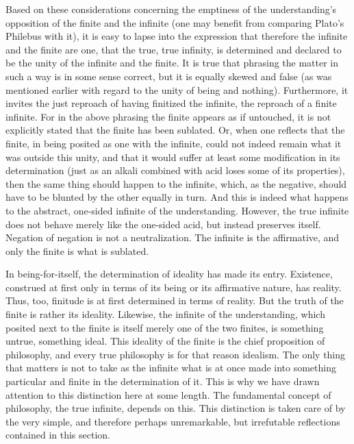     Based on these considerations concerning the emptiness of
    the understanding's opposition of the finite and the infinite
    (one may benefit from comparing Plato's Philebus with it),
    it is easy to lapse into the expression that therefore
    the infinite and the finite are one, that the true,
    true infinity, is determined and declared to be
    the unity of the infinite and the finite.
    It is true that phrasing the matter in such a way is
    in some sense correct, but it is equally skewed and false
    (as was mentioned earlier with regard to
    the unity of being and nothing).
    Furthermore, it invites the just reproach of having
    finitized the infinite, the reproach of a finite infinite.
    For in the above phrasing the finite appears as if untouched,
    it is not explicitly stated that the finite has been sublated.
    Or, when one reflects that the finite, in being posited as one with the
    infinite, could not indeed remain what it was outside this unity, and
    that it would suffer at least some modification in its determination
    (just as an alkali combined with acid loses some of its properties),
    then the same thing should happen to the infinite, which, as the
    negative, should have to be blunted by the other equally in turn.
    And this is indeed what happens to
    the abstract, one-sided infinite of the understanding.
    However, the true infinite does not behave merely like
    the one-sided acid, but instead preserves itself.
    Negation of negation is not a neutralization.
    The infinite is the affirmative,
    and only the finite is what is sublated.

In being-for-itself, the determination of
ideality has made its entry.
Existence, construed at first only
in terms of its being or
its affirmative nature, has reality.
Thus, too, finitude is at first
determined in terms of reality.
But the truth of the finite is rather its ideality.
Likewise, the infinite of the understanding,
which posited next to the finite is
itself merely one of the two finites,
is something untrue, something ideal.
This ideality of the finite is the
chief proposition of philosophy,
and every true philosophy is
for that reason idealism.
The only thing that matters is not to take as the infinite
what is at once made into something particular and finite
in the determination of it.
This is why we have drawn attention to
this distinction here at some length.
The fundamental concept of philosophy,
the true infinite, depends on this.
This distinction is taken care of
by the very simple, and therefore perhaps unremarkable,
but irrefutable reflections contained in this section.

